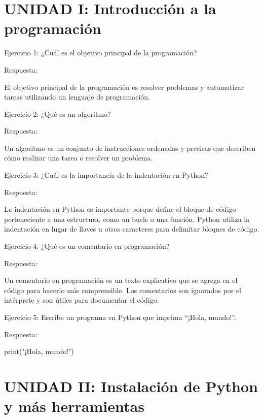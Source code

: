 \documentclass[
  a4paper,
  DIV=11,
  numbers=noendperiod,
  onepage,
  openany]{scrreprt}
\newenvironment{Shaded}{\begin{snugshade}}{\end{snugshade}}
\newcommand{\BuiltInTok}[1]{\textcolor[rgb]{0.00,0.23,0.31}{#1}}
\newcommand{\NormalTok}[1]{\textcolor[rgb]{0.00,0.23,0.31}{#1}}
\newcommand{\StringTok}[1]{\textcolor[rgb]{0.13,0.47,0.30}{#1}}
\begin{document}
\hypertarget{unidad-i-introducciuxf3n-a-la-programaciuxf3n-1}{%
\section{UNIDAD I: Introducción a la
programación}\label{unidad-i-introducciuxf3n-a-la-programaciuxf3n-1}}

Ejercicio 1: ¿Cuál es el objetivo principal de la programación?

Respuesta:

El objetivo principal de la programación es resolver problemas y
automatizar tareas utilizando un lenguaje de programación.

Ejercicio 2: ¿Qué es un algoritmo?

Respuesta:

Un algoritmo es un conjunto de instrucciones ordenadas y precisas que
describen cómo realizar una tarea o resolver un problema.

Ejercicio 3: ¿Cuál es la importancia de la indentación en Python?

Respuesta:

La indentación en Python es importante porque define el bloque de código
perteneciente a una estructura, como un bucle o una función. Python
utiliza la indentación en lugar de llaves u otros caracteres para
delimitar bloques de código.

Ejercicio 4: ¿Qué es un comentario en programación?

Respuesta:

Un comentario en programación es un texto explicativo que se agrega en
el código para hacerlo más comprensible. Los comentarios son ignorados
por el intérprete y son útiles para documentar el código.

Ejercicio 5: Escribe un programa en Python que imprima ``¡Hola,
mundo!''.

Respuesta:

\begin{Shaded}
\begin{Highlighting}[]
\BuiltInTok{print}\NormalTok{(}\StringTok{"¡Hola, mundo!"}\NormalTok{)}
\end{Highlighting}
\end{Shaded}

\hypertarget{unidad-ii-instalaciuxf3n-de-python-y-muxe1s-herramientas-1}{%
\section{UNIDAD II: Instalación de Python y más
herramientas}\label{unidad-ii-instalaciuxf3n-de-python-y-muxe1s-herramientas-1}}
\end{document}
